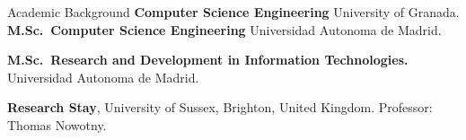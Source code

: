 \begin{rubric}{Academic Background}
\entry*[2014 -- 2018]%
	\textbf{Computer Science Engineering} University of Granada.
%
\entry*[2018 -- 2019]%
	\textbf{M.Sc.~Computer Science Engineering} Universidad Autonoma de Madrid.\par
\entry*[2018 -- 2019]%
	\textbf{M.Sc.~Research and Development in Information Technologies.} Universidad Autonoma de Madrid.\par

 \textbf{Research Stay}, University of Sussex, Brighton, United Kingdom. Professor: Thomas Nowotny.

\end{rubric}